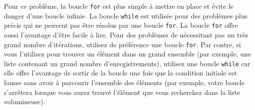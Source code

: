 \begin{Exercice}[10 minutes]
\begin{solution}
            
            Pour ce problème, la boucle \lstinline{for} est plus simple à mettre en place et évite le danger d'une boucle infinie. La boucle \lstinline{while} est utilisée pour des problèmes plus précis qui ne peuvent pas être résolus par une boucle \lstinline{for}. La boucle \lstinline{for} offre aussi l'avantage d'être facile à lire. Pour des problèmes de nécessitant pas un très grand nombre d'itérations, utilisez de préférence une boucle \lstinline{for}. Par contre, si vous l'utilisez pour trouver un élément dans un grand ensemble (par exemple, une liste contenant un grand nombre d'enregistrements), utilisez une boucle \lstinline{while} car elle offre l'avantage de sortir de la boucle une fois que la condition initiale est fausse sans avoir à parcourir l'ensemble des éléments (par exemple, votre boucle s'arrêtera lorsque vous aurez trouvé l'élément que vous recherchez dans la liste volumineuse).
            
        \end{solution}
    \end{Exercice}
    
